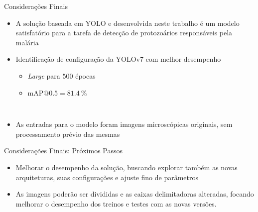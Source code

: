 \begin{frame}{Considerações Finais}
    \begin{itemize}
          \item A solução baseada em YOLO e desenvolvida neste trabalho é um modelo satisfatório para a tarefa de detecção de protozoários responsáveis pela malária
          \ \ \newline
          \item Identificação de configuração da YOLOv7 com melhor desempenho
          \begin{itemize}
              \item \emph{Large} para $500$ épocas
              \item \mbox{$\textrm{mAP@0.5} = \SI{81,4}{\percent}$} 
          \end{itemize}
          \ \ \newline
          \item As entradas para o modelo foram imagens microscópicas originais, sem processamento prévio das mesmas
    \end{itemize}
\end{frame}

\begin{frame}{Considerações Finais: Próximos Passos}
     \begin{itemize}
            \item Melhorar o desempenho da solução, buscando explorar também as novas arquiteturas, suas configurações e ajuste fino de parâmetros
            \ \ \newline
            \item As imagens poderão ser divididas e as caixas delimitadoras alteradas, focando melhorar o desempenho dos treinos e testes com as novas versões.
        \end{itemize}
\end{frame}
